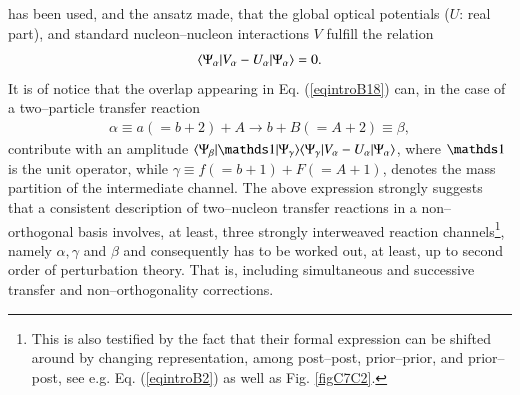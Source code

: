 has been used, and the ansatz made, that the
 global optical potentials ($U$: real part), and standard nucleon--nucleon interactions $V$  fulfill the relation
\begin{align}
\langle {\Psi_\alpha|V_\alpha-U_\alpha|\Psi_\alpha} \rangle=0.
\end{align}
It is of notice that the overlap appearing in Eq. (\ref{eqintroB18}) can, in the case of a two--particle transfer reaction 
\begin{align}
\alpha\equiv a (=b+2)+A\rightarrow b+B(=A+2)\equiv\beta,
\end{align}
contribute with an amplitude $\braket{\Psi_\beta|\idop|\Psi_\gamma}\braket{\Psi_\gamma|V_\alpha-U_\alpha|\Psi_\alpha}$, where $\idop$ is the unit operator, while $\gamma\equiv f(=b+1)+F(=A+1)$, denotes the mass partition of the intermediate channel. The above expression strongly suggests that a consistent description of two--nucleon transfer reactions in a non--orthogonal basis involves, at least, three strongly interweaved  reaction channels\footnote{This is also testified by the fact that their formal expression can be shifted around by changing representation, among  post--post, prior--prior, and prior--post, see e.g. Eq. (\ref{eqintroB2}) as well as Fig. \ref{figC7C2}.}, namely $\alpha,\gamma$ and $\beta$ and consequently has to be worked out, at least, up to second order of perturbation theory. That is, including simultaneous and successive transfer and non--orthogonality corrections.

